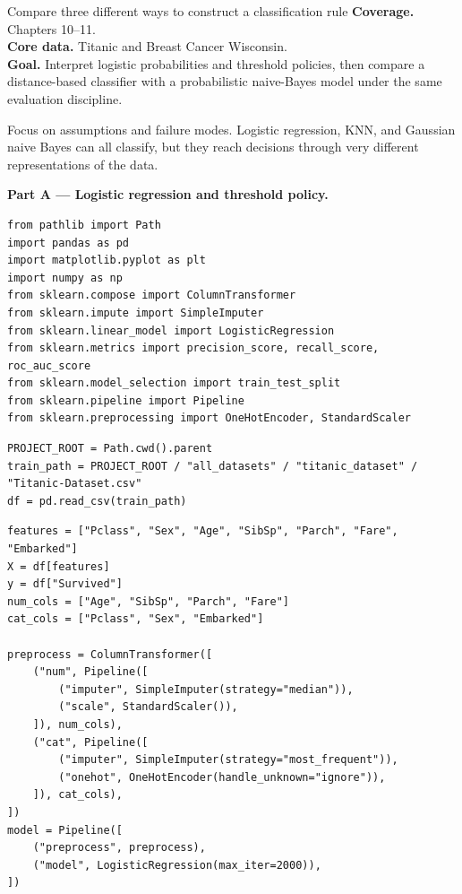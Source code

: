 
\begin{labproject}{Compare three different ways to construct a classification rule}
\textbf{Coverage.} Chapters 10--11.\\
\textbf{Core data.} Titanic and Breast Cancer Wisconsin.\\
\textbf{Goal.} Interpret logistic probabilities and threshold policies, then compare a distance-based classifier with a probabilistic naive-Bayes model under the same evaluation discipline.

\begin{labmode}
Focus on assumptions and failure modes. Logistic regression, KNN, and Gaussian naive Bayes can all classify, but they reach decisions through very different representations of the data.
\end{labmode}

\medskip\noindent\textbf{Part A --- Logistic regression and threshold policy.}\par
\begin{lstlisting}[style=mlpython]
from pathlib import Path
import pandas as pd
import matplotlib.pyplot as plt
import numpy as np
from sklearn.compose import ColumnTransformer
from sklearn.impute import SimpleImputer
from sklearn.linear_model import LogisticRegression
from sklearn.metrics import precision_score, recall_score, roc_auc_score
from sklearn.model_selection import train_test_split
from sklearn.pipeline import Pipeline
from sklearn.preprocessing import OneHotEncoder, StandardScaler
\end{lstlisting}

\begin{lstlisting}[style=mlpython]
PROJECT_ROOT = Path.cwd().parent
train_path = PROJECT_ROOT / "all_datasets" / "titanic_dataset" / "Titanic-Dataset.csv"
df = pd.read_csv(train_path)
\end{lstlisting}

\begin{lstlisting}[style=mlpython]
features = ["Pclass", "Sex", "Age", "SibSp", "Parch", "Fare", "Embarked"]
X = df[features]
y = df["Survived"]
num_cols = ["Age", "SibSp", "Parch", "Fare"]
cat_cols = ["Pclass", "Sex", "Embarked"]

preprocess = ColumnTransformer([
    ("num", Pipeline([
        ("imputer", SimpleImputer(strategy="median")),
        ("scale", StandardScaler()),
    ]), num_cols),
    ("cat", Pipeline([
        ("imputer", SimpleImputer(strategy="most_frequent")),
        ("onehot", OneHotEncoder(handle_unknown="ignore")),
    ]), cat_cols),
])
model = Pipeline([
    ("preprocess", preprocess),
    ("model", LogisticRegression(max_iter=2000)),
])


\end{lstlisting}
\end{labproject}
